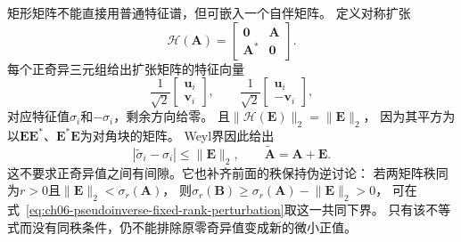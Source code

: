 矩形矩阵不能直接用普通特征谱，但可嵌入一个自伴矩阵。
定义对称扩张
\[
 \mathcal H(\bm A)=
 \begin{bmatrix}\bm0&\bm A\\\bm A^*&\bm0\end{bmatrix}.
\]
每个正奇异三元组给出扩张矩阵的特征向量
\[
 \frac1{\sqrt2}\begin{bmatrix}\bm u_i\\\bm v_i\end{bmatrix},
 \qquad
 \frac1{\sqrt2}\begin{bmatrix}\bm u_i\\-\bm v_i\end{bmatrix},
\]
对应特征值$\sigma_i$和$-\sigma_i$，剩余方向给零。
且$\lVert\mathcal H(\bm E)\rVert_2=\lVert\bm E\rVert_2$，
因为其平方为以$\bm E\bm E^*$、$\bm E^*\bm E$为对角块的矩阵。
Weyl界因此给出
\begin{equation}
 |\widetilde\sigma_i-\sigma_i|\leq\lVert\bm E\rVert_2,\qquad
 \widetilde{\bm A}=\bm A+\bm E.
 \label{eq:matrix-analysis-singular-value-perturbation}
\end{equation}
这不要求正奇异值之间有间隙。它也补齐前面的秩保持伪逆讨论：
若两矩阵秩同为$r>0$且$\lVert\bm E\rVert_2<\sigma_r(\bm A)$，
则$\sigma_r(\bm B)\geq\sigma_r(\bm A)-\lVert\bm E\rVert_2>0$，
可在式~\eqref{eq:ch06-pseudoinverse-fixed-rank-perturbation}取这一共同下界。
只有该不等式而没有同秩条件，仍不能排除原零奇异值变成新的微小正值。

